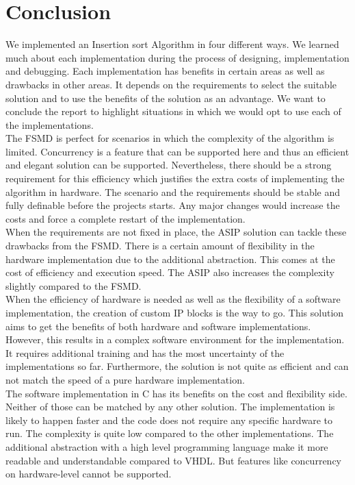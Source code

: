 \documentclass[conference]{IEEEtran}
\begin{document}
\section{Conclusion}
We implemented an Insertion sort Algorithm in four different ways. We learned much about each implementation during the process of designing, implementation and debugging. Each implementation has benefits in certain areas as well as drawbacks in other areas. It depends on the requirements to select the suitable solution and to use the benefits of the solution as an advantage. We want to conclude the report to highlight situations in which we would opt to use each of the implementations. \\
The FSMD is perfect for scenarios in which the complexity of the algorithm is limited. Concurrency is a feature that can be supported here and thus an efficient and elegant solution can be supported. Nevertheless, there should be a strong requirement for this efficiency which justifies the extra costs of implementing the algorithm in hardware. The scenario and the requirements should be stable and fully definable before the projects starts. Any major changes would increase the costs and force a complete restart of the implementation. \\
When the requirements are not fixed in place, the ASIP solution can tackle these drawbacks from the FSMD. There is a certain amount of flexibility in the hardware implementation due to the additional abstraction. This comes at the cost of efficiency and execution speed. The ASIP also increases the complexity slightly compared to the FSMD. \\
When the efficiency of hardware is needed as well as the flexibility of a software implementation, the creation of custom IP blocks is the way to go. This solution aims to get the benefits of both hardware and software implementations. However, this results in a complex software environment for the implementation. It requires additional training and has the most uncertainty of the implementations so far. Furthermore, the solution is not quite as efficient and can not match the speed of a pure hardware implementation.\\
The software implementation in C has its benefits on the cost and flexibility side. Neither of those can be matched by any other solution. The implementation is likely to happen faster and the code does not require any specific hardware to run. The complexity is quite low compared to the other implementations. The additional abstraction with a high level programming language make it more readable and understandable compared to VHDL. But features like concurrency on hardware-level cannot be supported.\\
\end{document}
